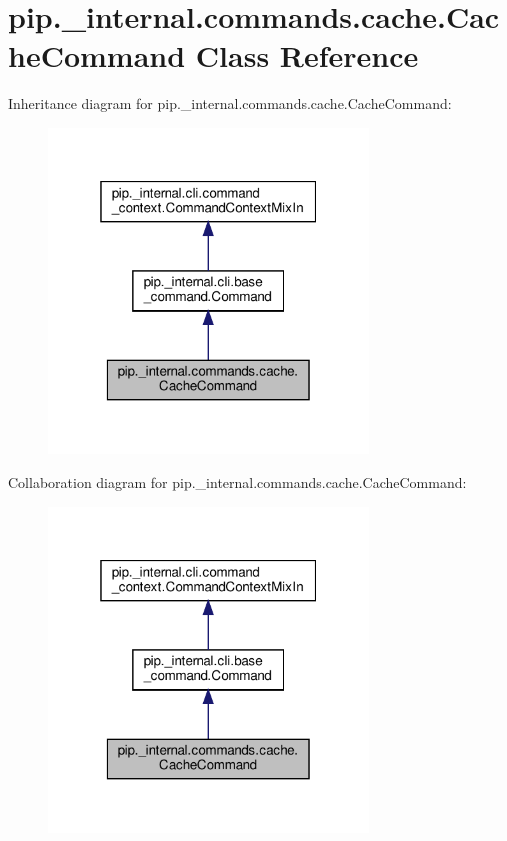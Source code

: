 \hypertarget{classpip_1_1__internal_1_1commands_1_1cache_1_1CacheCommand}{}\section{pip.\+\_\+internal.\+commands.\+cache.\+Cache\+Command Class Reference}
\label{classpip_1_1__internal_1_1commands_1_1cache_1_1CacheCommand}


Inheritance diagram for pip.\+\_\+internal.\+commands.\+cache.\+Cache\+Command\+:
\nopagebreak
\begin{figure}[H]
\begin{center}
\leavevmode
\includegraphics[width=241pt]{classpip_1_1__internal_1_1commands_1_1cache_1_1CacheCommand__inherit__graph}
\end{center}
\end{figure}


Collaboration diagram for pip.\+\_\+internal.\+commands.\+cache.\+Cache\+Command\+:
\nopagebreak
\begin{figure}[H]
\begin{center}
\leavevmode
\includegraphics[width=241pt]{classpip_1_1__internal_1_1commands_1_1cache_1_1CacheCommand__coll__graph}
\end{center}
\end{figure}
